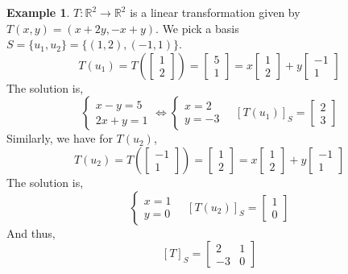 \documentclass{report}
\theoremstyle{definition}
\newtheorem{ex}{Example}[section]
\theoremstyle{remark}
\begin{document}
\begin{ex}
$T:\mathbb{R}^2\rightarrow\mathbb{R}^2$ is a linear transformation given by $T(x,y)=(x+2y,-x+y)$.
We pick a basis $S=\{u_1,u_2\}=\{(1,2),(-1,1)\}$.
\[T(u_1)=T\left(\begin{bmatrix}
1 \\ 2
\end{bmatrix}\right)=
\begin{bmatrix}
5 \\ 1
\end{bmatrix}=
x\begin{bmatrix}
1 \\ 2
\end{bmatrix}+
y\begin{bmatrix}
-1 \\ 1
\end{bmatrix}\]
The solution is,
\[
\left\lbrace\begin{array}{l}
x-y=5\\
2x+y=1
\end{array}\right.
\Leftrightarrow
\left\lbrace\begin{array}{l}
x=2\\
y=-3
\end{array}\right.
\quad
[T(u_1)]_S=\begin{bmatrix}
2 \\ 3
\end{bmatrix}
\]
Similarly, we have for $T(u_2)$,
\[
T(u_2)=T\left(\begin{bmatrix}
-1 \\ 1
\end{bmatrix}\right)=
\begin{bmatrix}
1 \\ 2
\end{bmatrix}=
x\begin{bmatrix}
1 \\ 2
\end{bmatrix}+
y\begin{bmatrix}
-1 \\ 1
\end{bmatrix}
\]
The solution is,
\[
\left\lbrace\begin{array}{l}
x=1\\
y=0
\end{array}\right.\quad
[T(u_2)]_S=\begin{bmatrix}
1 \\ 0
\end{bmatrix}
\]
And thus,
\[
[T]_S=\begin{bmatrix}
2 & 1 \\ -3 & 0
\end{bmatrix}
\]


\end{ex}
\end{document}
